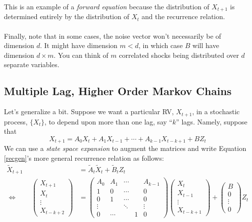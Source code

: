 \documentclass[12pt]{article}
\theoremstyle{plain}
\theoremstyle{definition}
\theoremstyle{remark}
\begin{document}
This is an example of a \emph{forward equation} because the
distribution of ${X}_{t+1}$ is determined entirely by
the distribution of ${X}_t$ and the recurrence relation.
\\
\\
Finally, note that in some cases, the noise vector won't necessarily
be of dimension $d$.  It might have dimension $m<d$, in which
case $B$ will have dimension $d\times m$. You can think of
$m$ correlated shocks being distributed over $d$ separate variables.


\newpage
\subsection{Multiple Lag, Higher Order Markov Chains}

Let's generalize a bit.  Suppose we want a particular RV,
${X}_{t+1}$, in a stochastic process, $\{{X}_t\}$, to
depend upon more than one lag, say ``$k$'' lags. Namely, suppose that
\begin{equation}
    \label{recgen}
    {X}_{t+1} = A_0 {X}_t + A_1 {X}_{t-1}
    + \cdots + A_{k-1}{X}_{t-k+1} + B {Z}_t
\end{equation}
We can use a \emph{state space expansion} to augment the matrices
and write Equation \ref{recgen}'s more general recurrence relation
as follows:
\begin{align*}
    \tilde{{X}}_{t+1} &= \tilde{A}_t
	\tilde{{X}}_t + \tilde{B}_t {Z}_t \\
    \Leftrightarrow \qquad
    \begin{pmatrix} {X}_{t+1} \\
	{X}_{t} \\ \vdots \\ {X}_{t-k+2} \end{pmatrix}
	&=
	\begin{pmatrix} A_0 & A_1 & \cdots & & A_{k-1} \\
			1 & 0 & \cdots & & 0 \\
			0 & 1 & \cdots & & 0 \\
			\vdots & & \ddots & & \vdots \\
			0 & \cdots & & 1 & 0
	\end{pmatrix}
	\begin{pmatrix} {X}_{t} \\
	{X}_{t-1} \\ \vdots \\ {X}_{t-k+1} \end{pmatrix}
	+ \begin{pmatrix} B \\ 0 \\ \vdots \\ 0 \end{pmatrix}
	{Z}_t
\end{align*}
\end{document}
